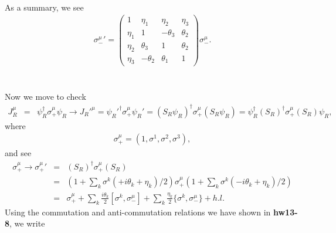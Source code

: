 \documentclass[11pt]{article}
\begin{document}
\begin{itemize}
\begin{enumerate}
\begin{eqnarray}
        \end{eqnarray}
    \end{enumerate}
    As a summary, we see
    \begin{eqnarray}
        {\sigma_-^\mu}'=
        \begin{pmatrix}
            1 & \eta_1 & \eta_2 & \eta_3 \\
            \eta_1 & 1 & -\theta_3 & \theta_2 \\
            \eta_2 & \theta_3 & 1 & \theta_2 \\
            \eta_3 & -\theta_2 & \theta_1 & 1
        \end{pmatrix}
        \sigma_-^\mu.
    \end{eqnarray}
\end{itemize}


\section{ }
Now we move to check
\begin{eqnarray}
    J_R^\mu
    &=& \psi_R^\dagger \sigma_+^\mu \psi_R
    \to J_R'^\mu
    = \psi_R'^\dagger \sigma_+^\mu \psi_R'
    = (S_R \psi_R)^\dagger \sigma_+^\mu (S_R \psi_R)
    = \psi_R^\dagger (S_R)^\dagger \sigma_+^\mu (S_R) \psi_R,
  \end{eqnarray}
  where
  \begin{eqnarray}
    \sigma_+^\mu=(1,\sigma^1,\sigma^2,\sigma^3),
\end{eqnarray}
and see
\begin{eqnarray}
    \sigma_+^\mu
      \to {\sigma_+^\mu}'
      &=& (S_R)^\dagger \sigma_+^\mu (S_R) \\
      &=& (1 + \sum_k \sigma^k (+i\theta_k +\eta_k)/2 )
        \sigma_+^\mu
        (1 + \sum_k \sigma^k (-i\theta_k +\eta_k)/2 ) \\ 
      &=& \sigma_+^\mu
       +\sum_k \frac{i\theta_k}{2} [\sigma^k,\sigma_-^\mu]
       +\sum_k \frac{\eta_k}{2}  \{ \sigma^k,\sigma_-^\mu \} + h.l. 
\end{eqnarray}
Using the commutation and anti-commutation relations we have shown in {\bf hw13-8}, we write
\end{document}
